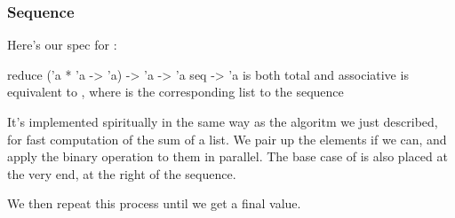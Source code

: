\documentclass[aspectratio=169, handout]{beamer}
\begin{document}
\begin{frame}[fragile]
  \frametitle{Sequence }

  Here's our spec for :

  \pause
  \spec
    {reduce}
    {('a * 'a -> 'a) -> 'a -> 'a seq -> 'a}
    { is both total and associative}
    { is equivalent to , where 
    is the corresponding list to the sequence }

  \pause
  It's implemented spiritually in the same way as the algoritm we just described,
  for fast computation of the sum of a list. We pair up the elements if we can,
  and apply the binary operation to them in parallel. The base case of 
  is also placed at the very end, at the right of the sequence.

  \pause
  \vspace{\fill}

  We then repeat this process until we get a final value.
\end{frame}
\end{document}
